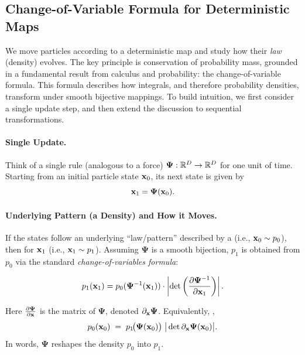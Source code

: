 \subsection{Change-of-Variable Formula for Deterministic Maps}\label{subsec:cov-det}
We move particles according to a deterministic map and study how their \emph{law} (density) evolves. The key principle is conservation of probability mass, grounded in a fundamental result from calculus and probability: the change-of-variable formula. This formula describes how integrals, and therefore probability densities, transform under smooth bijective mappings. To build intuition, we first consider a single update step, and then extend the discussion to sequential transformations.


\paragraph{Single Update.}
Think of a single   rule  (analogous to a force) 
$\bm{\Psi}:\mathbb{R}^D \to \mathbb{R}^D$ for one unit of time. 
Starting from an initial particle state ${\mathbf{x}}_0$, its next state is given by
\[
{\mathbf{x}}_1 = \bm{\Psi}({\mathbf{x}}_0).
\]

\paragraph{Underlying Pattern (a Density) and How it Moves.}
If the  states follow an underlying ``law/pattern'' described by a  (i.e., ${\mathbf{x}}_0\sim p_0$),
then  for ${\mathbf{x}}_1$ (i.e., ${\mathbf{x}}_1\sim p_1$).
Assuming $\bm{\Psi}$ is a smooth bijection, $p_1$ is obtained from $p_0$ via the standard \emph{change-of-variables formula}:
\begin{mdframed}
\begin{equation}\label{eq:change-of-variable-density}
p_{1}({\mathbf{x}}_1) = p_{0}(\bm{\Psi}^{-1}({\mathbf{x}}_1)) \cdot \left| \det \left( \frac{\partial \bm{\Psi}^{-1}}{\partial {\mathbf{x}}_1} \right) \right|.
\end{equation}
\end{mdframed}
Here $\tfrac{\partial \bm{\Psi}}{\partial {\mathbf{x}}}$ is the  matrix of $\bm{\Psi}$, denoted $\partial_{\mathbf{x}} \bm{\Psi}$.  
Equivalently, ,
\[
p_0({\mathbf{x}}_0) \;=\; p_1\!\big(\bm{\Psi}({\mathbf{x}}_0)\big)\;\big|\det \partial_{\mathbf{x}} \bm{\Psi}({\mathbf{x}}_0)\big|.
\]
In words, $\bm{\Psi}$ reshapes the density $p_0$ into $p_1$.   

